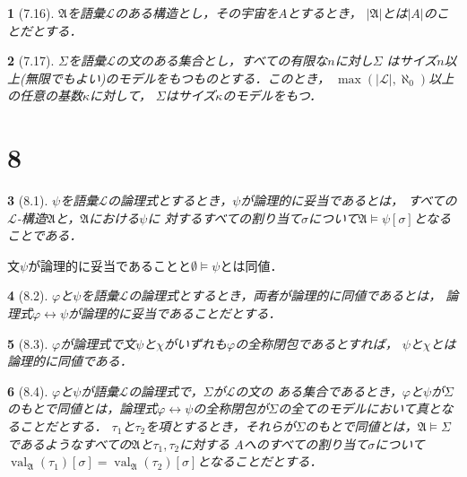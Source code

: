 \documentclass[a4j,10.5pt,oneside,openany]{jsbook}
\theoremstyle{mystyle}
\newtheorem{thm}{\color{DarkMidnightBlue}{定理}}[section]
\newtheorem{dfn}[thm]{\color{PakistanGreen}{定義}}
\newcommand{\val}{\operatorname{val}} %
\begin{document}
	\begin{screen}
		\begin{dfn}[7.16]
			$\mathfrak{A}$を語彙$\mathcal{L}$のある構造とし，その宇宙を$A$とするとき，
			$|\mathfrak{A}|$とは$|A|$のことだとする．
		\end{dfn}
	\end{screen}
	
	\begin{screen}
		\begin{thm}[7.17]
			$\Sigma$を語彙$\mathcal{L}$の文のある集合とし，すべての有限な$n$に対し$\Sigma$
			はサイズ$n$以上(無限でもよい)のモデルをもつものとする．このとき，
			$\max(|\mathcal{L}|,\aleph_{0})$以上の任意の基数$\kappa$に対して，
			$\Sigma$はサイズ$\kappa$のモデルをもつ．
		\end{thm}
	\end{screen}
	
\section{8}
	\begin{screen}
		\begin{dfn}[8.1]
			$\psi$を語彙$\mathcal{L}$の論理式とするとき，$\psi$が論理的に妥当であるとは，
			すべての$\mathcal{L}$-構造$\mathfrak{A}$と，$\mathfrak{A}$における$\psi$に
			対するすべての割り当て$\sigma$について$\mathfrak{A} \models \psi[\sigma]$となることである．
		\end{dfn}
	\end{screen}
	
	文$\psi$が論理的に妥当であることと$\emptyset \models \psi$とは同値．
	
	\begin{screen}
		\begin{dfn}[8.2]
			$\varphi$と$\psi$を語彙$\mathcal{L}$の論理式とするとき，両者が論理的に同値であるとは，
			論理式$\varphi \leftrightarrow \psi$が論理的に妥当であることだとする．
		\end{dfn}
	\end{screen}
	
	\begin{screen}
		\begin{thm}[8.3]
			$\varphi$が論理式で文$\psi$と$\chi$がいずれも$\varphi$の全称閉包であるとすれば，
			$\psi$と$\chi$とは論理的に同値である．
		\end{thm}
	\end{screen}
	
	\begin{screen}
		\begin{dfn}[8.4]
			$\varphi$と$\psi$が語彙$\mathcal{L}$の論理式で，$\Sigma$が$\mathcal{L}$の文の
			ある集合であるとき，$\varphi$と$\psi$が$\Sigma$のもとで同値とは，論理式$\varphi
			\leftrightarrow \psi$の全称閉包が$\Sigma$の全てのモデルにおいて真となることだとする．
			$\tau_{1}$と$\tau_{2}$を項とするとき，それらが$\Sigma$のもとで同値とは，$\mathfrak{A}
			\models \Sigma$であるようなすべての$\mathfrak{A}$と$\tau_{1},\tau_{2}$に対する
			$A$へのすべての割り当て$\sigma$について$\val_{\mathfrak{A}}(\tau_{1})[\sigma]
			= \val_{\mathfrak{A}}(\tau_{2})[\sigma]$となることだとする．
		\end{dfn}
	\end{screen}
	
\end{document}
